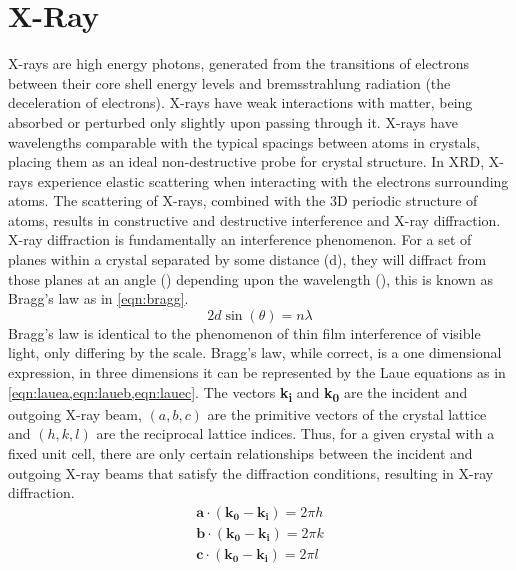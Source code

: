 \section{X-Ray}
X-rays are high energy photons, generated from the transitions of electrons between their core shell energy levels and bremsstrahlung radiation (the deceleration of electrons).
X-rays have weak interactions with matter, being absorbed or perturbed only slightly upon passing through it.
X-rays have wavelengths comparable with the typical spacings between atoms in crystals, placing them as an ideal non-destructive probe for crystal structure.
In XRD, X-rays experience elastic scattering when interacting with the electrons surrounding atoms.
The scattering of X-rays, combined with the 3D periodic structure of atoms, results in constructive and destructive interference and X-ray diffraction\cite{zavalij}.
X-ray diffraction is fundamentally an interference phenomenon. 
For a set of planes within a crystal separated by some distance (d), they will diffract from those planes at an angle (\straighttheta) depending upon the wavelength (\textlambda{}), this is known as Bragg's law as in \cref{eqn:bragg}.
\begin{equation}
\label{eqn:bragg}
2d \sin(\theta) = n \lambda
\end{equation}
Bragg's law is identical to the phenomenon of thin film interference of visible light, only differing by the scale.
Bragg's law, while correct, is a one dimensional expression, in three dimensions it can be represented by the Laue equations as in \cref{eqn:lauea,eqn:laueb,eqn:lauec}.
The vectors \textbf{k\textsubscript{i}} and \textbf{k\textsubscript{0}} are the incident and outgoing X-ray beam, \((a,b,c)\) are the primitive vectors of the crystal lattice and \((h,k,l)\) are the reciprocal lattice indices.
Thus, for a given crystal with a fixed unit cell, there are only certain relationships between the incident and outgoing X-ray beams that satisfy the diffraction conditions, resulting in X-ray diffraction.
\begin{align}
 \mathbf{a} \cdot (\mathbf{k_0} - \mathbf{k_i}) = 2 \pi h \label{eqn:lauea} \\
 \mathbf{b} \cdot (\mathbf{k_0} - \mathbf{k_i}) = 2 \pi k \label{eqn:laueb} \\
 \mathbf{c} \cdot (\mathbf{k_0} - \mathbf{k_i}) = 2 \pi l \label{eqn:lauec}
\end{align}

